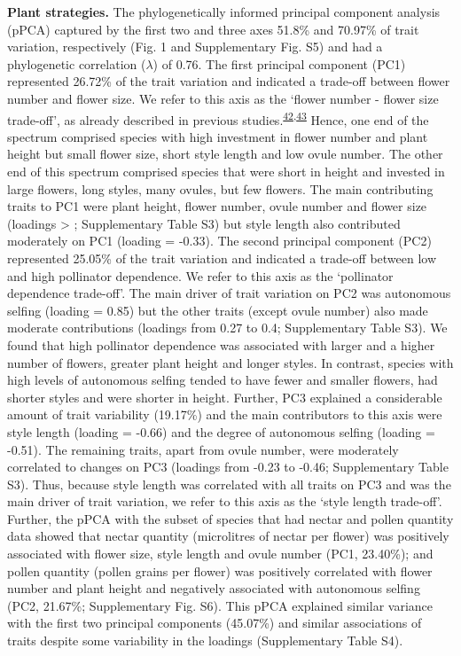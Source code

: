 \documentclass[
  12pt,
  a4paper,
]{article}
\begin{document}
\textbf{Plant strategies.} The phylogenetically informed principal component analysis (pPCA) captured by the first two and three axes 51.8\% and 70.97\% of trait variation, respectively (Fig. 1 and Supplementary Fig. S5) and had a phylogenetic correlation (\(\lambda\)) of 0.76. The first principal component (PC1) represented 26.72\% of the trait variation and indicated a trade-off between flower number and flower size. We refer to this axis as the `flower number - flower size trade-off', as already described in previous studies.\textsuperscript{\protect\hyperlink{ref-sargent2007}{42},\protect\hyperlink{ref-kettle2011}{43}} Hence, one end of the spectrum comprised species with high investment in flower number and plant height but small flower size, short style length and low ovule number. The other end of this spectrum comprised species that were short in height and invested in large flowers, long styles, many ovules, but few flowers. The main contributing traits to PC1 were plant height, flower number, ovule number and flower size (loadings \textgreater{} \textbar; Supplementary Table S3) but style length also contributed moderately on PC1 (loading = -0.33). The second principal component (PC2) represented 25.05\% of the trait variation and indicated a trade-off between low and high pollinator dependence. We refer to this axis as the `pollinator dependence trade-off'. The main driver of trait variation on PC2 was autonomous selfing (loading = 0.85) but the other traits (except ovule number) also made moderate contributions (loadings from 0.27 to 0.4; Supplementary Table S3). We found that high pollinator dependence was associated with larger and a higher number of flowers, greater plant height and longer styles. In contrast, species with high levels of autonomous selfing tended to have fewer and smaller flowers, had shorter styles and were shorter in height. Further, PC3 explained a considerable amount of trait variability (19.17\%) and the main contributors to this axis were style length (loading = -0.66) and the degree of autonomous selfing (loading = -0.51). The remaining traits, apart from ovule number, were moderately correlated to changes on PC3 (loadings from -0.23 to -0.46; Supplementary Table S3). Thus, because style length was correlated with all traits on PC3 and was the main driver of trait variation, we refer to this axis as the `style length trade-off'. Further, the pPCA with the subset of species that had nectar and pollen quantity data showed that nectar quantity (microlitres of nectar per flower) was positively associated with flower size, style length and ovule number (PC1, 23.40\%); and pollen quantity (pollen grains per flower) was positively correlated with flower number and plant height and negatively associated with autonomous selfing (PC2, 21.67\%; Supplementary Fig. S6). This pPCA explained similar variance with the first two principal components (45.07\%) and similar associations of traits despite some variability in the loadings (Supplementary Table S4).
\end{document}
